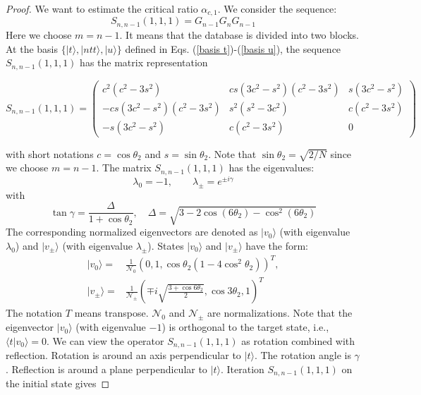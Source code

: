 \documentclass[%
 twocolumn,
 10pt,
 superscriptaddress,
 longbibliography,
 amsmath,amssymb,
 aps,
 pra,
floatfix,
]{revtex4-1}
\begin{document}
\begin{proof}
We want to estimate the critical ratio $\alpha_{c,1}$. We consider the sequence:
\begin{equation}
    S_{n,n-1}(1,1,1) = G_{n-1}G_{n}G_{n-1}
\end{equation}
Here we choose $m=n-1$. It means that the database is divided into two blocks. At the basis $\{|t\rangle,|ntt\rangle,|u\rangle\}$ defined in Eqs. (\ref{basis t})-(\ref{basis u}), the sequence $S_{n,n-1}(1,1,1)$ has the matrix representation
\begin{widetext}
    \begin{equation}
    \label{def S 111}
    S_{n,n-1}(1,1,1)=\left(
    \begin{array}{ccc}
    c^2(c^2-3s^2)	& cs(3c^2-s^2)(c^2-3s^2) & s(3c^2-s^2) \\ 
    -cs(3c^2-s^2)(c^2-3s^2)	& s^2(s^2-3c^2)  & c(c^2-3s^2) \\ 
    -s(3c^2-s^2)	& c(c^2-3s^2) & 0
    \end{array} 
    \right)
    \end{equation}
\end{widetext}
with short notations $c=\cos\theta_2$ and $s=\sin\theta_2$. Note that $\sin\theta_2=\sqrt{2/N}$ since we choose $m=n-1$. The matrix $S_{n,n-1}(1,1,1)$ has the eigenvalues:
\begin{equation}
    \lambda_0 = -1,\quad\quad \lambda_\pm = e^{\pm i\gamma}
\end{equation}
with
\begin{equation}
    \tan \gamma = \frac{\Delta}{1+\cos\theta_2},\quad
    \Delta = \sqrt {3-2\cos(6\theta_2)-\cos^2(6\theta_2)}
\end{equation}
The corresponding normalized eigenvectors are denoted as $|v_0\rangle$ (with eigenvalue $\lambda_0$) and $|v_\pm\rangle$ (with eigenvalue $\lambda_\pm$). States $|v_0\rangle$ and $|v_\pm\rangle$ have the form:
\begin{subequations}
    	\begin{align}
    	\label{eigen lambda 0} |v_0\rangle =& \frac 1 {\mathcal N_0}\left(0,1,\cos\theta_2(1-4\cos^2\theta_2)\right)^T,\\
    	\label{eigen lambda +-} |v_\pm\rangle =& \frac 1 {\mathcal N_\pm}\left(\mp i \sqrt{\frac{3+\cos 6\theta_2}{2}},\cos 3\theta_2,1\right)^T
    	\end{align}
\end{subequations}
The notation $T$ means transpose. $\mathcal N_0$ and $\mathcal N_\pm$ are normalizations. Note that the eigenvector $|v_0\rangle$ (with eigenvalue $-1$) is orthogonal to the target state, i.e., $\langle t|v_0\rangle=0$. We can view the operator $S_{n,n-1}(1,1,1)$ as rotation combined with reflection. Rotation is around an axis perpendicular to $|t\rangle$. The rotation angle is $\gamma$. Reflection is around a plane perpendicular to $|t\rangle$. Iteration $S_{n,n-1}(1,1,1)$ on the initial state gives

\end{proof}
\end{document}
